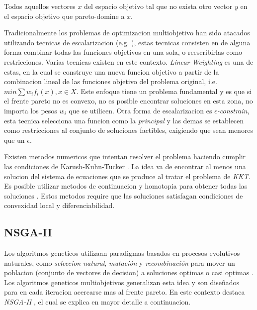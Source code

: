 \begin{definition}
\label{definition:pareto-front}
    Todos aquellos vectores $x$ del espacio objetivo tal que no exista otro vector $y$ en el espacio objetivo que pareto-domine a $x$.
\end{definition}

Tradicionalmente los problemas de optimizacion multiobjetivo han sido atacados utilizando tecnicas de escalarizacion (e.g. \cite{miettinen2012nonlinear}), estas tecnicas consisten en de alguna forma combinar todas las funciones objetivos en una sola, o reescribirlas como restricciones. Varias tecnicas existen en este contexto. \textit{Linear Weighting} es una de estas, en la cual se construye una nueva funcion objetivo a partir de la combinacion lineal de las funciones objetivo del problema original, i.e. $min \sum w_i f_i(x), x \in X$. Este enfoque tiene un problema fundamental y es que si el frente pareto no es convexo, no es posible encontrar soluciones en esta zona, no importa los pesos $w_i$ que se utilicen. Otra forma de escalarizacion es \textit{$\epsilon$-constrain}, esta tecnica selecciona una funcion como la \textit{principal} y las demas se establecen como restricciones al conjunto de soluciones factibles, exigiendo que sean menores que un $\epsilon$.

Existen metodos numericos que intentan resolver el problema haciendo cumplir las condiciones de Karush-Kuhn-Tucker \cite{kuhn2014nonlinear}. La idea va de encontrar al menos una solucion del sistema de ecuaciones que se produce al tratar el problema de \textit{KKT}. Es posible utilizar metodos de continuacion y homotopia para obtener todas las soluciones \cite{hillermeier2001nonlinear, schutze2005continuation}. Estos metodos require que las soluciones satisfagan condiciones de convexidad local y diferenciabilidad.

\subsection{NSGA-II}

Los algoritmos geneticos utilizaan paradigmas basados en procesos evolutivos naturales, como \textit{seleccion natural}, \textit{mutaci\'on} y \textit{recombinaci\'on} para mover un poblacion (conjunto de vectores de decision) a soluciones optimas o casi optimas \cite{back1996evolutionary}. Los algoritmos geneticos multiobjetivos generalizan esta idea y son diseñados para en cada iteracion acercarse mas al frente pareto. En este contexto destaca \emph{NSGA-II} \cite{deb2002nsgaii}, el cual se explica en mayor detalle a continuacion.

